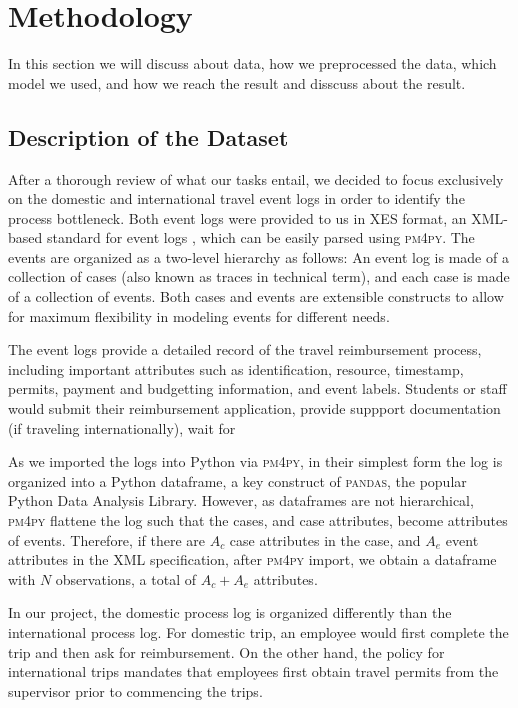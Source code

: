 \documentclass[conference]{IEEEtran}
\begin{document}
\section{Methodology}
\label{section-methodology}

In this section we will discuss about data,
how we preprocessed the data,
which model we used, and how
we reach the result and disscuss about the result.

\subsection{Description of the Dataset}

After a thorough review of what our tasks entail, we decided to focus
exclusively on the domestic and international travel event logs in order
to identify the process bottleneck.  Both event logs
were provided to us in XES format,
an XML-based standard for event logs \cite{XES2021}, which can
be easily parsed using \textsc{pm4py}.
The events are organized as a two-level hierarchy as follows:
An event log is made of a collection of cases
(also known as traces in technical
term), and each case is made of a collection of events. Both cases and
events are extensible constructs to allow for maximum flexibility in
modeling events for different needs.

The event logs provide a detailed record of the travel reimbursement process,
including important attributes such as identification, resource,
timestamp, permits, payment and budgetting information, and event labels.
Students or staff would submit their reimbursement application,
provide suppport documentation (if traveling internationally), wait for

As we imported the logs into Python via \textsc{pm4py}, in their simplest form the
log is organized into a Python dataframe, a key construct of
\textsc{pandas}, the popular Python Data Analysis Library. However, as
dataframes are not hierarchical, \textsc{pm4py} flattene the log such that the
cases, and case attributes, become attributes of events. Therefore, if
there are $A_c$ case attributes in the case, and $A_e$ event attributes in the
XML specification, after \textsc{pm4py} import, we obtain a dataframe 
with $N$ observations, a total of $A_c + A_e$ attributes.

In our project,
the domestic process log is organized differently than
the international process log.  For domestic trip, an employee would first
complete the trip and then ask for reimbursement. On the other hand,
the policy for international trips mandates that
employees first obtain travel permits from the supervisor prior to
commencing the trips.
\end{document}
